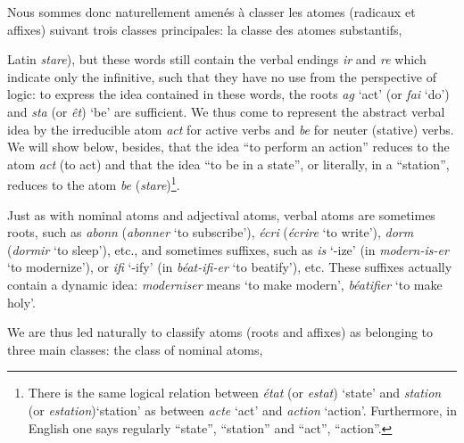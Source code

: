 \begin{sloppypar}
{  Nous sommes donc naturellement amenés à classer les atomes (radicaux
  et affixes) suivant trois classes principales: la classe des atomes
  substantifs, }%
{\noindent Latin \emph{stare}), but these words still contain the
  verbal endings \emph{ir} and \emph{re} which indicate only the
  infinitive, such that they have no use from the perspective of
  logic: to express the idea contained in these words, the roots
  \emph{ag} `act' (or \emph{fai} `do') and \emph{sta} (or \emph{êt})
  `be' are sufficient. We thus come to represent the abstract verbal
  idea by the irreducible atom \emph{act} for active verbs and
  \emph{be} for neuter (stative) verbs. We will show below, besides,
  that the idea ``to perform an action'' reduces to the atom
  \emph{act} (to act) and that the idea ``to be in a state'', or
  literally, in a ``station'', reduces to the atom \emph{be}
  (\emph{stare})\footnote{There is the same logical relation between
    \emph{état} (or \emph{estat}) `state' and \emph{station} (or
    \emph{estation})`station' as between \emph{acte} `act' and
    \emph{action} `action'. Furthermore, in English one says regularly
    ``state'', ``station'' and ``act'', ``action''.}.

  Just as with nominal atoms and adjectival atoms, verbal atoms are
  sometimes roots, such as \emph{abonn} (\emph{abonner} `to
  subscribe'), \emph{écri} (\emph{écrire} `to write'), \emph{dorm}
  (\emph{dormir} `to sleep'), etc., and sometimes suffixes, such as
  \emph{is} `-ize' (in \emph{modern-is-er} `to modernize'), or
  \emph{ifi} `-ify' (in \emph{béat-ifi-er} `to beatify'), etc. These
  suffixes actually contain a dynamic idea: \emph{moderniser} means
  `to make modern', \emph{béatifier} `to make holy'.

  We are thus led naturally to classify atoms (roots and affixes) as
  belonging to three main classes: the class of nominal atoms, }

\end{sloppypar}
